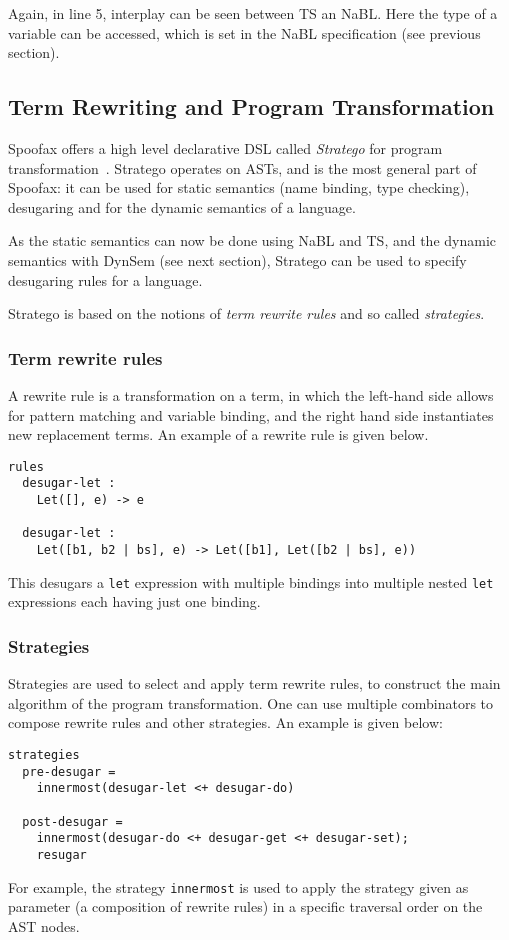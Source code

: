 Again, in line 5, interplay can be seen between TS an NaBL. Here the
type of a variable can be accessed, which is set in the NaBL
specification (see previous section).
\subsection{Term Rewriting and Program Transformation}
\label{sec-term-rewrite}
Spoofax offers a high level declarative DSL called \emph{Stratego} for
program transformation~\cite{Visser01}. Stratego operates on ASTs,
and is the most general part of Spoofax: it can be used for static
semantics (name binding, type checking), desugaring and for the
dynamic semantics of a language.

As the static semantics can now be done using NaBL and TS, and the
dynamic semantics with DynSem (see next section), Stratego can be used
to specify desugaring rules for a language.

Stratego is based on the notions of \emph{term rewrite rules} and so called
\emph{strategies}.
\subsubsection{Term rewrite rules}
\label{sec:orgheadline5}
A rewrite rule is a transformation on a term, in which the left-hand
side allows for pattern matching and variable binding, and the right
hand side instantiates new replacement terms. An example of a rewrite
rule is given below.
\begin{verbatim}
rules
  desugar-let :
  	Let([], e) -> e

  desugar-let :
  	Let([b1, b2 | bs], e) -> Let([b1], Let([b2 | bs], e))
\end{verbatim}
This desugars a \texttt{let} expression with multiple bindings into multiple
nested \texttt{let} expressions each having just one binding.
\subsubsection{Strategies}
\label{sec:orgheadline6}
Strategies are used to select and apply term rewrite rules, to
construct the main algorithm of the program transformation. One can
use multiple combinators to compose rewrite rules and other
strategies. An example is given below:
\begin{verbatim}
strategies
  pre-desugar =
    innermost(desugar-let <+ desugar-do)

  post-desugar =
    innermost(desugar-do <+ desugar-get <+ desugar-set);
    resugar
\end{verbatim}
For example, the strategy \texttt{innermost} is used to apply the strategy
given as parameter (a composition of rewrite rules) in a specific
traversal order on the AST nodes.
